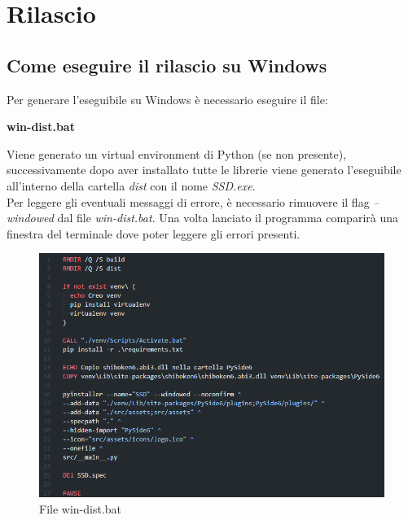 \section{Rilascio}

\subsection{Come eseguire il rilascio su Windows}
Per generare l'eseguibile su Windows è necessario eseguire il file:
\newline{}\centerline{\textbf{win-dist.bat}}\newline{}
Viene generato un virtual environment di Python (se non presente), successivamente dopo aver installato tutte le librerie viene generato l'eseguibile all'interno della cartella \textit{dist} con il nome \textit{SSD.exe}.\\
Per leggere gli eventuali messaggi di errore, è necessario rimuovere il flag \textit{--windowed} dal file \textit{win-dist.bat}. Una volta lanciato il programma comparirà una finestra del terminale dove poter leggere gli errori presenti.
\begin{figure}[H]
    \centering
    \includegraphics[scale = 0.6]{components/img/pyinstaller.png}
    \caption{File win-dist.bat}
    \label{fig:File win-dist.bat}
\end{figure}

